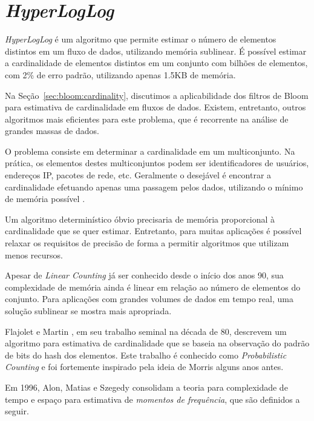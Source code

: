 
\section{\emph{HyperLogLog}}\label{sec:hyperloglog}

\emph{HyperLogLog} é um algoritmo que permite estimar o número de elementos distintos em um fluxo de dados, utilizando memória sublinear. É possível estimar a cardinalidade de elementos distintos em um conjunto com bilhões de elementos, com 2\% de erro padrão, utilizando apenas 1.5KB de memória.

Na Seção~\ref{sec:bloom:cardinality}, discutimos a aplicabilidade dos filtros de Bloom para estimativa de cardinalidade em fluxos de dados. Existem, entretanto, outros algoritmos mais eficientes para este problema, que é recorrente na análise de grandes massas de dados.

O problema consiste em determinar a cardinalidade em um multiconjunto. Na prática, os elementos destes multiconjuntos podem ser identificadores de usuários, endereços IP, pacotes de rede, etc. Geralmente o desejável é encontrar a cardinalidade efetuando apenas uma passagem pelos dados, utilizando o mínimo de memória possível \cite{metwally2008go,clifford2012statistical}. 

Um algoritmo determinístico óbvio precisaria de memória proporcional à cardinalidade que se quer estimar. Entretanto, para muitas aplicações é possível relaxar os requisitos de precisão de forma a permitir algoritmos que utilizam menos recursos.

Apesar de \emph{Linear Counting} \cite{whang1990linear} já ser conhecido desde o início dos anos 90, sua complexidade de memória ainda é linear em relação ao número de elementos do conjunto. Para aplicações com grandes volumes de dados em tempo real, uma solução sublinear se mostra mais apropriada.

Flajolet e Martin \cite{flajolet1985probabilistic}, em seu trabalho seminal na década de 80, descrevem um algoritmo para estimativa de cardinalidade que se baseia na observação do padrão de bits do hash dos elementos. Este trabalho é conhecido como \emph{Probabilistic Counting} e foi fortemente inspirado pela ideia de Morris \cite{morris1978counting} alguns anos antes. 

Em 1996, Alon, Matias e Szegedy \cite{alon1996space} consolidam a teoria para complexidade de tempo e espaço para estimativa de \emph{momentos de frequência}, que são definidos a seguir.

